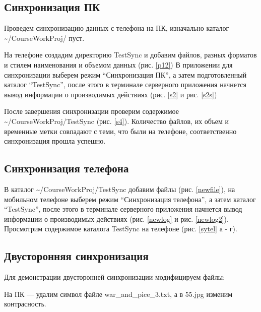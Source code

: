 \subsection{Синхронизация ПК}
Проведем синхронизацию данных с телефона на ПК, изначально каталог \~{}/CourseWorkProj/ пуст. 

На телефоне создадим директорию TestSync и добавим файлов, разных форматов и стилем наименования и объемом данных (рис. \ref{p12})
В приложении для синхронизации выберем режим ``Синхронизация ПК'', а затем подготовленный каталог ``TestSync'', после этого в терминале серверного приложения начнется вывод информации о производимых действиях (рис. \ref{s2} и рис. \ref{s2s})

После завершения синхронизации проверим содержимое \~{}/CourseWorkProj/TestSync (рис. \ref{s4}). Количество файлов, их объем и временные метки совпадают с теми, что были на телефоне, соответственно синхронизация прошла успешно.

\subsection{Синхронизация телефона}
В каталог \~{}/CourseWorkProj/TestSync добавим файлы (рис. \ref{newfile}), на мобильном телефоне выберем режим ``Синхронизация телефона'', а затем каталог ``TestSync'', после этого в терминале серверного приложения начнется вывод информации о производимых действиях (рис. \ref{newlog} и рис. \ref{newlog2}). Просмотрим содержимое каталога TestSync на телефоне (рис. \ref{sytel} а - г).

\newpage
\subsection{Двусторонняя синхронизация}
Для демонстрации двусторонней синхронизации модифицируем файлы:

На ПК --- удалим символ файле war\_and\_pice\_3.txt, а в 55.jpg изменим контрасность.

